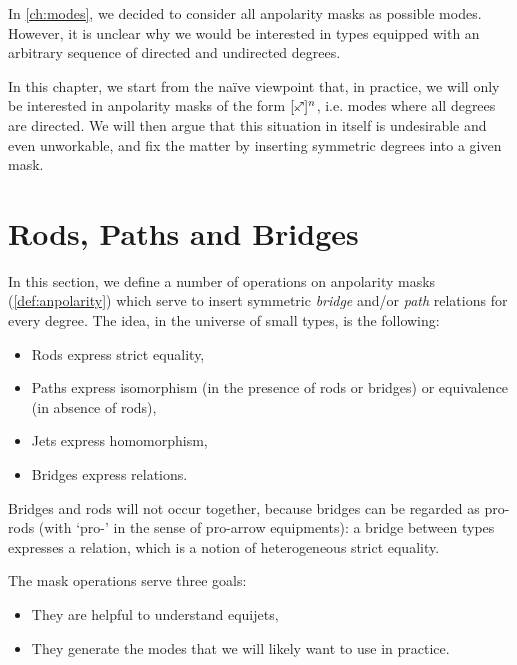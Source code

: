 \documentclass[a4paper]{memoir}
\begin{document}
In \cref{ch:modes}, we decided to consider all anpolarity masks as possible modes.
However, it is unclear why we would be interested in types equipped with an arbitrary sequence of directed and undirected degrees.

In this chapter, we start from the na\"ive viewpoint that, in practice, we will only be interested in anpolarity masks of the form $[\ypolar]^n$, i.e. modes where all degrees are directed.
We will then argue that this situation in itself is undesirable and even unworkable, and fix the matter by inserting symmetric degrees into a given mask.





\section{Rods, Paths and Bridges} \label{sec:pb}
In this section, we define a number of operations on anpolarity masks (\cref{def:anpolarity}) which serve to insert symmetric \emph{bridge} and/or \emph{path} relations for every degree.
The idea, in the universe of small types, is the following:
\begin{itemize}
	\item Rods express strict equality,
	\item Paths express isomorphism (in the presence of rods or bridges) or equivalence (in absence of rods),
	\item Jets express homomorphism,
	\item Bridges express relations.
\end{itemize}
Bridges and rods will not occur together, because bridges can be regarded as pro-rods (with `pro-' in the sense of pro-arrow equipments): a bridge between types expresses a relation, which is a notion of heterogeneous strict equality.

The mask operations serve three goals:
\begin{itemize}
	\item They are helpful to understand equijets,
	\item They generate the modes that we will likely want to use in practice.
\end{itemize}
\end{document}
